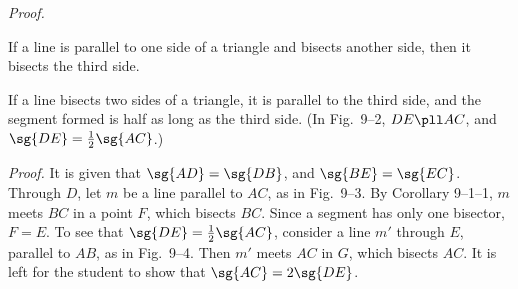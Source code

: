 \documentclass[11pt]{book}
\theoremstyle{bkplain}
\theoremstyle{XIplainnote}
\theoremstyle{bkplain}
\theoremstyle{bkplain}
\begin{document}
\noindent\emph{Proof.}
\begin{steps}
\end{steps}

\FIGIXONE

\FIGIXTWOTHREE

\begin{corollary}
If a line is parallel to one side of a triangle and bisects another side, then it
bisects the third side.
\end{corollary}

\begin{corollary}
If a line bisects two sides of a triangle, it is parallel to the third side, and
the segment formed is half as long as the third side. (In Fig.~9--2,
$DE \pll AC$, and $\sg{DE} = \frac{1}{2}\sg{AC}$.)
\end{corollary}

\noindent\emph{Proof.} It is given that $\sg{AD} = \sg{DB}$, and
$\sg{BE} = \sg{EC}$. Through $D$, let $m$ be a line parallel to $AC$, as in
Fig.~9--3. By Corollary 9--1--1, $m$ meets $BC$ in a point $F$, which bisects
$BC$. Since a segment has only one bisector, $F = E$. To see that
$\sg{DE} = \frac{1}{2}\sg{AC}$, consider a line $m'$ through $E$, parallel to
$AB$, as in Fig.~9--4. Then $m'$ meets $AC$ in $G$, which bisects $AC$. It is
left for the student to show that $\sg{AC} = 2\sg{DE}$.

\FIGIXFOUR
\end{document}
